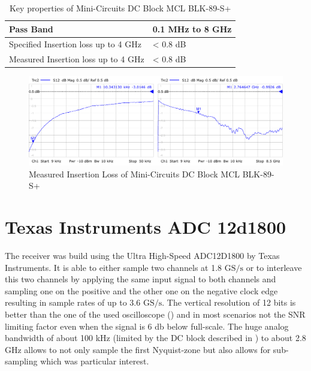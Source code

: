 \begin{table}[h]
  \centering
  \begin{tabular}{|l|l|}
    \hline
    Pass Band & 0.1 MHz to 8 GHz \\ \hline
    Specified Insertion loss up to 4 GHz & < 0.8 dB \\ \hline
    Measured Insertion loss up to 4 GHz & < 0.8 dB \\ \hline
  \end{tabular}
  \caption{Key properties of Mini-Circuits DC Block MCL BLK-89-S+}
  \label{tab:awg}
\end{table}

\begin{figure}
  \centering
  \includegraphics[width=\textwidth]{figures/MCL_BLK-89-S+_DC-Block_insertion_loss}
  \caption{Measured Insertion Loss of Mini-Circuits DC Block MCL BLK-89-S+}
  \label{fig:comp_dc_block_insertion_loss}
\end{figure}

\section{Texas Instruments ADC 12d1800}
\label{sec:comp_adc}
The receiver was build using the Ultra High-Speed ADC12D1800 by Texas Instruments.
It is able to either sample two channels at 1.8 $\text{GS}/\text{s}$ or to interleave
this two channels by applying the same input signal to both channels and sampling
one on the positive and the other one on the negative clock edge resulting in sample
rates of up to 3.6 $\text{GS}/\text{s}$. The vertical resolution of 12 bits is better
than the one of the used oscilloscope () and in most scenarios
not the \gls{SNR} limiting factor even when the signal is 6 db below full-scale.
The huge analog bandwidth of about 100 kHz
(limited by the \gls{DC} block described in ) to about
2.8 GHz allows to not only sample the first Nyquist-zone but also allows
for sub-sampling which was particular interest. \\

